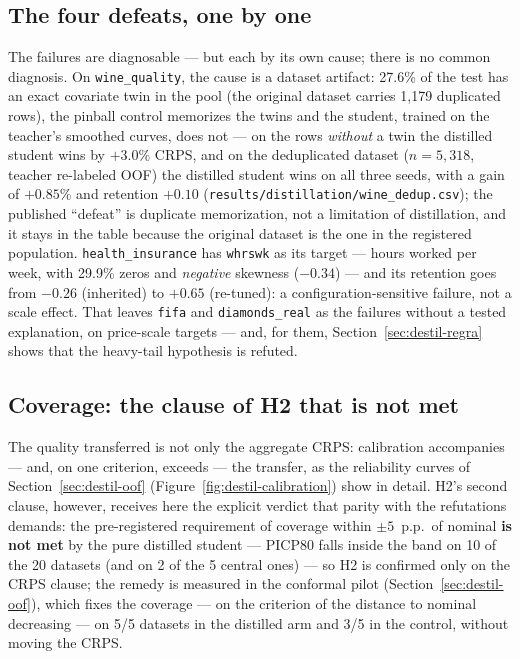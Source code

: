 \subsection{The four defeats, one by one}
\label{sec:destil-derrotas}

The failures are diagnosable --- but each by its own cause; there is
no common diagnosis. On \texttt{wine\_quality}, the cause is a
dataset artifact: 27.6\% of the test has an exact covariate twin in
the pool (the original dataset carries 1{,}179 duplicated rows), the
pinball control memorizes the twins and the student, trained on the
teacher's smoothed curves, does not --- on the rows \emph{without} a
twin the distilled student wins by $+3.0\%$ CRPS, and on the
deduplicated dataset ($n=5{,}318$, teacher re-labeled OOF) the
distilled student wins on all three seeds, with a gain of $+0.85\%$
and retention $+0.10$
(\texttt{results/\allowbreak distillation/\allowbreak wine\_\allowbreak dedup.csv});
the published ``defeat'' is duplicate memorization, not a
limitation of distillation, and it stays in the table because the
original dataset is the one in the registered population.
\texttt{health\_\allowbreak insurance} has \texttt{whrswk} as its
target --- hours worked per week, with 29.9\% zeros and
\emph{negative} skewness ($-0.34$) --- and its retention goes from $-0.26$
(inherited) to $+0.65$ (re-tuned): a configuration-sensitive
failure, not a scale effect. That leaves \texttt{fifa} and
\texttt{diamonds\_\allowbreak real} as the failures without a tested
explanation, on price-scale targets --- and, for them,
Section~\ref{sec:destil-regra} shows that the heavy-tail hypothesis
is refuted.

\subsection{Coverage: the clause of H2 that is not met}
\label{sec:destil-cobertura}

The quality transferred is not only the aggregate CRPS: calibration
accompanies --- and, on one criterion, exceeds --- the transfer, as
the reliability curves of Section~\ref{sec:destil-oof}
(Figure~\ref{fig:destil-calibration}) show in detail. H2's second
clause, however, receives here the explicit verdict that parity with
the refutations demands: the pre-registered requirement of coverage
within $\pm 5$~p.p.\ of nominal \textbf{is not met} by the pure
distilled student --- PICP80 falls inside the band on 10 of the 20
datasets (and on 2 of the 5 central ones) --- so H2 is confirmed
only on the CRPS clause; the remedy is measured in the conformal
pilot (Section~\ref{sec:destil-oof}), which fixes the coverage ---
on the criterion of the distance to nominal decreasing --- on 5/5
datasets in the distilled arm and 3/5 in the control, without moving
the CRPS.

